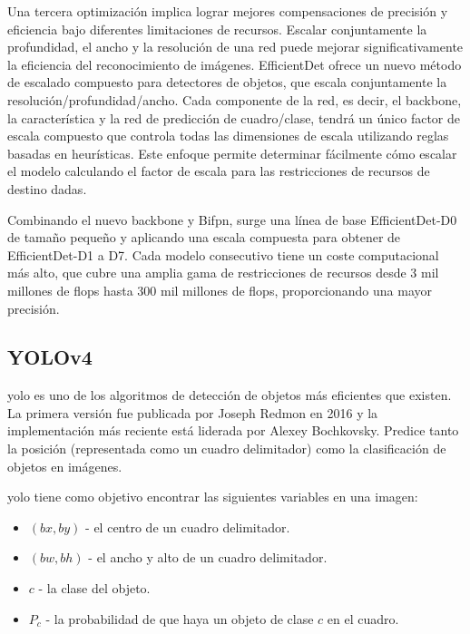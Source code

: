 Una tercera optimización implica lograr mejores compensaciones de precisión y eficiencia bajo diferentes limitaciones de recursos. Escalar conjuntamente la profundidad, el ancho y la resolución de una red puede mejorar significativamente la eficiencia del reconocimiento de imágenes. EfficientDet ofrece un nuevo método de escalado compuesto para detectores de objetos, que escala conjuntamente la resolución/profundidad/ancho. Cada componente de la red, es decir, el backbone, la característica y la red de predicción de cuadro/clase, tendrá un único factor de escala compuesto que controla todas las dimensiones de escala utilizando reglas basadas en heurísticas. Este enfoque permite determinar fácilmente cómo escalar el modelo calculando el factor de escala para las restricciones de recursos de destino dadas.

Combinando el nuevo backbone y Bi\gls{fpn}, surge una línea de base EfficientDet-D0 de tamaño pequeño y aplicando una escala compuesta para obtener de EfficientDet-D1 a D7. Cada modelo consecutivo tiene un coste computacional más alto, que cubre una amplia gama de restricciones de recursos desde 3 mil millones de \gls{flops} hasta 300 mil millones de \gls{flops}, proporcionando una mayor precisión.

\subsection{YOLOv4}
\label{subsec:yolov4}

\gls{yolo} \cite{bochkovskiy2020yolov4} es uno de los algoritmos de detección de objetos más eficientes que existen. La primera versión fue publicada por Joseph Redmon \cite{redmon2016look} en 2016 y la implementación más reciente \cite{bochkovskiy2020yolov4} está liderada por Alexey Bochkovsky. Predice tanto la posición (representada como un cuadro delimitador) como la clasificación de objetos en imágenes.

\gls{yolo} tiene como objetivo encontrar las siguientes variables en una imagen:

\begin{itemize}
    \item $(bx, by)$ - el centro de un cuadro delimitador.
    \item $(bw, bh)$ - el ancho y alto de un cuadro delimitador.
    \item $c$ - la clase del objeto.
    \item $P_c$ - la probabilidad de que haya un objeto de clase $c$ en el cuadro.
\end{itemize}

